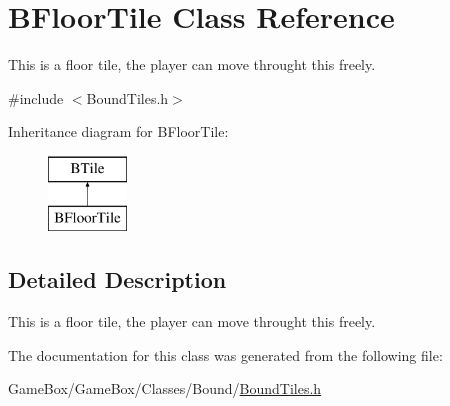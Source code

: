 \hypertarget{class_b_floor_tile}{\section{\-B\-Floor\-Tile \-Class \-Reference}
\label{class_b_floor_tile}
}


\-This is a floor tile, the player can move throught this freely.  




{\ttfamily \#include $<$\-Bound\-Tiles.\-h$>$}

\-Inheritance diagram for \-B\-Floor\-Tile\-:\begin{figure}[H]
\begin{center}
\leavevmode
\includegraphics[height=2.000000cm]{class_b_floor_tile}
\end{center}
\end{figure}


\subsection{\-Detailed \-Description}
\-This is a floor tile, the player can move throught this freely. 

\-The documentation for this class was generated from the following file\-:\begin{DoxyCompactItemize}
\item 
\-Game\-Box/\-Game\-Box/\-Classes/\-Bound/\hyperlink{_bound_tiles_8h}{\-Bound\-Tiles.\-h}\end{DoxyCompactItemize}
